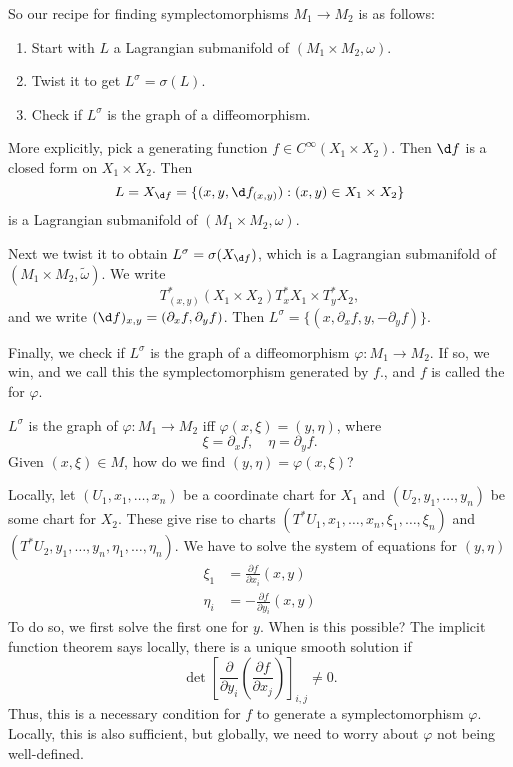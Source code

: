 \documentclass[a4paper]{article}
\begin{document}
So our recipe for finding symplectomorphisms $M_1 \to M_2$ is as follows:
\begin{enumerate}
  \item Start with $L$ a Lagrangian submanifold of $(M_1 \times M_2, \omega)$.
  \item Twist it to get $L^\sigma = \sigma(L)$.
  \item Check if $L^\sigma$ is the graph of a diffeomorphism.
\end{enumerate}
More explicitly, pick a generating function $f \in C^\infty(X_1 \times X_2)$. Then $\d f$ is a closed form on $X_1 \times X_2$. Then
\[
  L = X_{\d f} = \{(x, y, \d f_{(x, y)}): (x, y) \in X_1 \times X_2\}
\]
is a Lagrangian submanifold of $(M_1 \times M_2, \omega)$.

Next we twist it to obtain $L^\sigma = \sigma(X_{\d f})$, which is a Lagrangian submanifold of $(M_1 \times M_2, \tilde{\omega})$. We write
\[
  T^*_{(x, y)} (X_1 \times X_2) T_x^* X_1 \times T_y^* X_2,
\]
and we write $(\d f)_{x, y} = (\partial_x f, \partial_y f)$. Then $L^\sigma = \{(x, \partial_x f, y, -\partial_y f)\}$.

Finally, we check if $L^\sigma$ is the graph of a diffeomorphism $\varphi: M_1 \to M_2$. If so, we win, and we call this the symplectomorphism generated by $f$., and $f$ is called the  for $\varphi$.

$L^\sigma$ is the graph of $\varphi: M_1 \to M_2$ iff $\varphi(x, \xi) = (y, \eta)$, where
\[
  \xi = \partial_x f,\quad \eta = \partial_y f.
\]
Given $(x, \xi) \in M$, how do we find $(y, \eta) = \varphi(x, \xi)$?

Locally, let $(U_1, x_1, \ldots, x_n)$ be a coordinate chart for $X_1$ and $(U_2, y_1, \ldots, y_n)$ be some chart for $X_2$. These give rise to charts $(T^* U_1, x_1, \ldots, x_n, \xi_1, \ldots, \xi_n)$ and $(T^* U_2, y_1, \ldots, y_n, \eta_1, \ldots, \eta_n)$. We have to solve the system of equations for $(y, \eta)$
\begin{align*}
  \xi_1 &= \frac{\partial f}{\partial x_i} (x, y)\\
  \eta_i &= - \frac{\partial f}{\partial y_i} (x, y)
\end{align*}
To do so, we first solve the first one for $y$. When is this possible? The implicit function theorem says locally, there is a unique smooth solution if
\[
  \det \left[\frac{\partial}{\partial y_i}\left(\frac{\partial f}{\partial x_j}\right)\right]_{i, j} \not= 0.
\]
Thus, this is a necessary condition for $f$ to generate a symplectomorphism $\varphi$. Locally, this is also sufficient, but globally, we need to worry about $\varphi$ not being well-defined.
\end{document}
